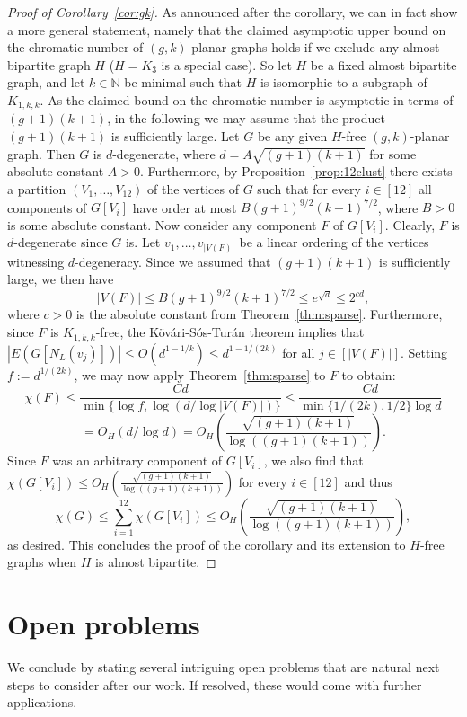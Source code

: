 \documentclass[10pt]{amsart}
\theoremstyle{definition}
\begin{document}
\begin{proof}[Proof of Corollary~\ref{cor:gk}]As announced after the corollary, we can in fact show a more general statement, namely that the claimed asymptotic upper bound on the chromatic number of $(g,k)$-planar graphs holds if we exclude any almost bipartite graph $H$ ($H=K_3$ is a special case). So let $H$ be a fixed almost bipartite graph, and let $k\in \mathbb{N}$ be minimal such that $H$ is isomorphic to a subgraph of $K_{1,k,k}$. As the claimed bound on the chromatic number is asymptotic in terms of $(g+1)(k+1)$, in the following we may assume that the product $(g+1)(k+1)$ is sufficiently large. Let $G$ be any given $H$-free $(g,k)$-planar graph. Then $G$ is $d$-degenerate, where $d= A\sqrt{(g+1)(k+1)}$ for some absolute constant $A>0$. Furthermore, by Proposition~\ref{prop:12clust} there exists a partition $(V_1,\ldots,V_{12})$ of the vertices of $G$ such that for every $i\in [12]$ all components of $G[V_i]$ have order at most $B(g+1)^{9/2}(k+1)^{7/2}$, where $B>0$ is some absolute constant. Now consider any component $F$ of $G[V_i]$. Clearly, $F$ is $d$-degenerate since $G$ is. Let $v_1,\ldots,v_{|V(F)|}$ be a linear ordering of the vertices witnessing $d$-degeneracy. Since we assumed that $(g+1)(k+1)$ is sufficiently large, we then have 
$$|V(F)|\le B(g+1)^{9/2}(k+1)^{7/2}\le e^{\sqrt{d}}\le 2^{cd},$$ where $c>0$ is the absolute constant from Theorem~\ref{thm:sparse}. Furthermore, since $F$ is $K_{1,k,k}$-free, the K\"{o}v\'{a}ri-S\'{o}s-Tur\'{a}n theorem implies that $|E(G[N_L(v_j)])|\le O(d^{1-1/k})\le d^{1-1/(2k)}$ for all $j\in [|V(F)|]$. Setting $f:=d^{1/(2k)}$, we may now apply Theorem~\ref{thm:sparse} to $F$ to obtain:
$$\chi(F)\le \frac{Cd}{\min\{\log f, \log(d/\log |V(F)|)\}}\le \frac{Cd}{\min\{1/(2k),1/2\}\log d}$$ $$=O_H(d/\log d)=O_H\left(\frac{\sqrt{(g+1)(k+1)}}{\log ((g+1)(k+1))}\right).$$ Since $F$ was an arbitrary component of $G[V_i]$, we also find that $\chi(G[V_i])\le O_H\left(\frac{\sqrt{(g+1)(k+1)}}{\log ((g+1)(k+1))}\right)$ for every $i\in [12]$ and thus
$$\chi(G)\le \sum_{i=1}^{12}{\chi(G[V_i])}\le O_H\left(\frac{\sqrt{(g+1)(k+1)}}{\log ((g+1)(k+1))}\right),$$ as desired. This concludes the proof of the corollary and its extension to $H$-free graphs when $H$ is almost bipartite.
\end{proof}
\section{Open problems}
We conclude by stating several intriguing open problems that are natural next steps to consider after our work. If resolved, these would come with further applications.
\end{document}
